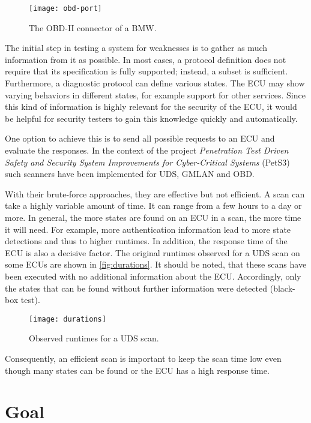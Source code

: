 \begin{figure}[htb]
    \centering
    \texttt{[image: obd-port]}
    \caption{The OBD-II connector of a BMW.}
    \label{fig:obd-port}
\end{figure}

The initial step in testing a system for weaknesses is to gather as much information from it as possible. In most cases, a protocol definition does not require that its specification is fully supported; instead, a subset is sufficient.
Furthermore, a diagnostic protocol can define various states. The ECU may show varying behaviors in different states, for example support for other services. Since this kind of information is highly relevant for the security of the ECU, it would be helpful for security testers to gain this knowledge quickly and automatically.

One option to achieve this is to send all possible requests to an ECU and evaluate the responses. In the context of the project \emph{Penetration Test Driven Safety and Security System Improvements for Cyber-Critical Systems} (PetS3) \cite{pets3} such scanners have been implemented for UDS, GMLAN and OBD.

With their brute-force approaches, they are effective but not efficient. A scan can take a highly variable amount of time. It can range from a few hours to a day or more. In general, the more states are found on an ECU in a scan, the more time it will need. For example, more authentication information lead to more state detections and thus to higher runtimes. In addition, the response time of the ECU is also a decisive factor. The original runtimes observed for a UDS scan on some ECUs are shown in \autoref{fig:durations}. It should be noted, that these scans have been executed with no additional information about the ECU. Accordingly, only the states that can be found without further information were detected (black-box test).

\begin{figure}[htb]
    \centering
    \texttt{[image: durations]}
    \caption{Observed runtimes for a UDS scan.}
    \label{fig:durations}
\end{figure}

Consequently, an efficient scan is important to keep the scan time low even though many states can be found or the ECU has a high response time.

\section{Goal}

